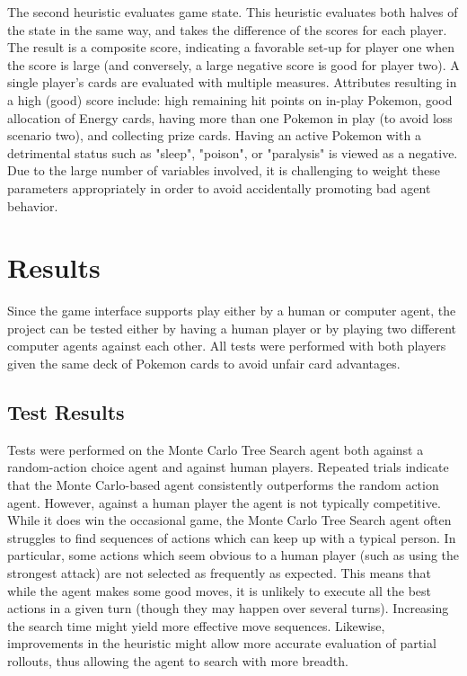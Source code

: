 \documentclass{article}
\begin{document}
The second heuristic evaluates game state.  This heuristic evaluates both halves of the state in the same way, and takes the difference of the scores for each player.  The result is a composite score, indicating a favorable set-up for player one when the score is large (and conversely, a large negative score is good for player two).  A single player's cards are evaluated with multiple measures.  Attributes resulting in a high (good) score include: high remaining hit points on in-play Pokemon, good allocation of Energy cards, having more than one Pokemon in play (to avoid loss scenario two), and collecting prize cards.  Having an active Pokemon with a detrimental status such as "sleep", "poison", or "paralysis" is viewed as a negative.  Due to the large number of variables involved, it is challenging to weight these parameters appropriately in order to avoid accidentally promoting bad agent behavior.

\section{Results} %
Since the game interface supports play either by a human or computer agent, the project can be tested either by having a human player or by playing two different computer agents against each other.  All tests were performed with both players given the same deck of Pokemon cards to avoid unfair card advantages.

\subsection{Test Results} %
Tests were performed on the Monte Carlo Tree Search agent both against a random-action choice agent and against human players.  Repeated trials indicate that the Monte Carlo-based agent consistently outperforms the random action agent.  However, against a human player the agent is not typically competitive.  While it does win the occasional game, the Monte Carlo Tree Search agent often struggles to find sequences of actions which can keep up with a typical person.  In particular, some actions which seem obvious to a human player (such as using the strongest attack) are not selected as frequently as expected.  This means that while the agent makes some good moves, it is unlikely to execute all the best actions in a given turn (though they may happen over several turns).  Increasing the search time might yield more effective move sequences.  Likewise, improvements in the heuristic might allow more accurate evaluation of partial rollouts, thus allowing the agent to search with more breadth.
\end{document}
